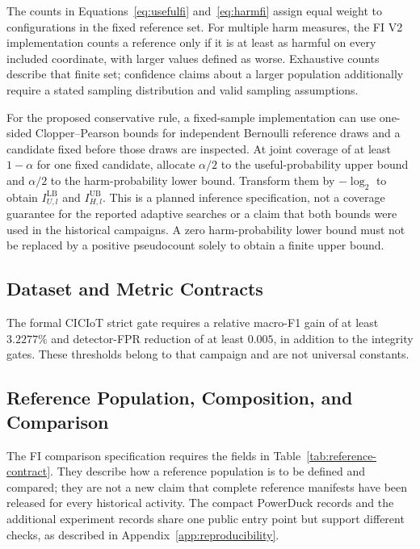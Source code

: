 \documentclass[manuscript,screen,nonacm]{acmart}
\begin{document}
The counts in Equations~\ref{eq:usefulfi} and~\ref{eq:harmfi} assign equal
weight to configurations in the fixed reference set. For multiple harm
measures, the FI V2 implementation counts a reference only if it is
at least as harmful on every included coordinate, with larger values
defined as worse. Exhaustive counts describe that finite set; confidence
claims about a larger population additionally require a stated sampling
distribution and valid sampling assumptions.

For the proposed conservative rule, a fixed-sample implementation can use
one-sided Clopper--Pearson bounds for independent Bernoulli reference
draws and a candidate fixed before those draws are inspected.
At joint coverage of at least $1-\alpha$ for one fixed candidate,
allocate $\alpha/2$ to the useful-probability upper bound and $\alpha/2$
to the harm-probability lower bound. Transform them by $-\log_2$ to obtain
$I_{U,l}^{\mathrm{LB}}$ and $I_{H,l}^{\mathrm{UB}}$.
This is a planned inference specification, not a coverage guarantee for
the reported adaptive searches or a claim that both bounds were used in
the historical campaigns. A zero harm-probability lower bound must not be
replaced by a positive pseudocount solely to obtain a finite upper bound.

\subsection{Dataset and Metric Contracts}


The formal CICIoT strict gate requires a relative macro-F1 gain of at least $3.2277\%$ and detector-FPR reduction of at least $0.005$, in addition to the integrity gates. These thresholds belong to that campaign and are not universal constants.

\subsection{Reference Population, Composition, and Comparison}
\label{app:reference-population}

The FI comparison specification requires the fields in Table~\ref{tab:reference-contract}. They describe how a reference population is to be defined and compared; they are not a new claim that complete reference manifests have been released for every historical activity. The compact PowerDuck records and the additional experiment records share one public entry point but support different checks, as described in Appendix~\ref{app:reproducibility}.
\end{document}
